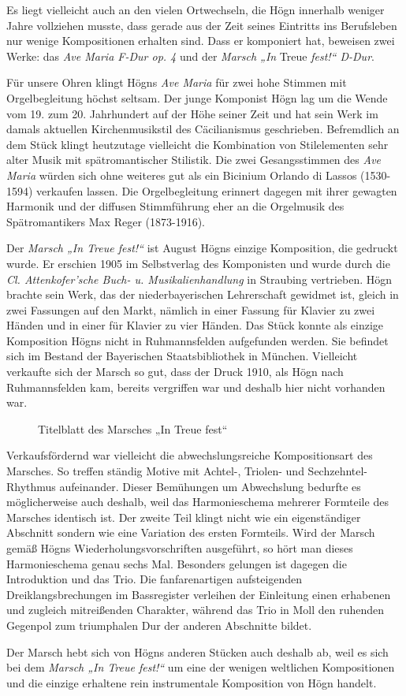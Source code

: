 Es liegt vielleicht auch an den vielen Ortwechseln, die Högn innerhalb
weniger Jahre vollziehen musste, dass gerade aus der Zeit seines
Eintritts ins Berufsleben nur wenige Kompositionen erhalten sind. Dass
er komponiert hat, beweisen zwei Werke: das \textit{Ave Maria F-Dur op.
4} und der \textit{Marsch „In} Treue \textit{fest!“ D-Dur}.

Für unsere Ohren klingt Högns \textit{Ave Maria} für zwei hohe Stimmen
mit Orgelbegleitung höchst seltsam. Der junge Komponist Högn lag um
die Wende vom 19. zum 20. Jahrhundert auf der Höhe seiner Zeit und hat
sein Werk im damals aktuellen Kirchenmusikstil des Cäcilianismus
geschrieben. Befremdlich an dem Stück klingt heutzutage vielleicht die
Kombination von Stilelementen sehr alter Musik mit spätromantischer
Stilistik. Die zwei Gesangsstimmen des \textit{Ave Maria} würden sich
ohne weiteres gut als ein Bicinium Orlando di Lassos (1530-1594)
verkaufen lassen. Die Orgelbegleitung erinnert dagegen mit ihrer
gewagten Harmonik und der diffusen Stimmführung eher an die Orgelmusik
des Spätromantikers Max Reger (1873-1916).

Der \textit{Marsch „In Treue fest!“} ist August Högns einzige
Komposition, die gedruckt wurde. Er erschien 1905 im Selbstverlag des
Komponisten und wurde durch die \textit{Cl. Attenkofer’sche Buch- u.
Musikalienhandlung} in Straubing vertrieben. Högn brachte sein Werk,
das der niederbayerischen Lehrerschaft gewidmet ist, gleich in zwei
Fassungen auf den Markt, nämlich in einer Fassung für Klavier zu zwei
Händen und in einer für Klavier zu vier Händen. Das Stück konnte als
einzige Komposition Högns nicht in Ruhmannsfelden aufgefunden werden.
Sie befindet sich im Bestand der Bayerischen Staatsbibliothek in
München. Vielleicht verkaufte sich der Marsch so gut, dass der Druck
1910, als Högn nach Ruhmannsfelden kam, bereits vergriffen war und
deshalb hier nicht vorhanden war.

\begin{figure}
\caption{Titelblatt des Marsches „In Treue fest“}
\end{figure}

Verkaufsfördernd war vielleicht die abwechslungsreiche Kompositionsart
des Marsches. So treffen ständig Motive mit Achtel-, Triolen- und
Sechzehntel-Rhythmus aufeinander. Dieser Bemühungen um Abwechslung
bedurfte es möglicherweise auch deshalb, weil das Harmonieschema
mehrerer Formteile des Marsches identisch ist. Der zweite Teil klingt
nicht wie ein eigenständiger Abschnitt sondern wie eine Variation des
ersten Formteils. Wird der Marsch gemäß Högns Wiederholungsvorschriften
ausgeführt, so hört man dieses Harmonieschema genau sechs Mal.
Besonders gelungen ist dagegen die Introduktion und das Trio. Die
fanfarenartigen aufsteigenden Dreiklangsbrechungen im Bassregister
verleihen der Einleitung einen erhabenen und zugleich mitreißenden
Charakter, während das Trio in Moll den ruhenden Gegenpol zum
triumphalen Dur der anderen Abschnitte bildet.

Der Marsch hebt sich von Högns anderen Stücken auch deshalb ab, weil es
sich bei dem \textit{Marsch „In Treue fest!“} um eine der wenigen
weltlichen Kompositionen und die einzige erhaltene rein instrumentale
Komposition von Högn handelt.